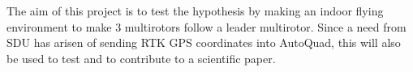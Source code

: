 The aim of this project is to test the hypothesis by making an indoor flying environment to make 3 multirotors follow a leader multirotor. Since a need from SDU has arisen of sending RTK GPS coordinates into AutoQuad, this will also be used to test and to contribute to a scientific paper.

